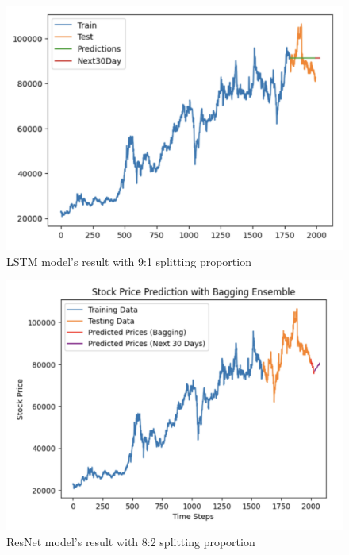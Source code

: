 \documentclass{ieeeojies}
\begin{document}
\begin{figure}[H]
  \centering
  \begin{minipage}{0.8\linewidth}
    \centering
    \includegraphics[width=\linewidth]{bibliography/ETS_VCB91.png}
    \caption{LSTM model's result with 9:1 splitting proportion}
    \label{fig14}
  \end{minipage}
\end{figure}
\begin{figure}[H]
  \centering
  \begin{minipage}{0.8\linewidth}
    \centering
    \includegraphics[width=\linewidth]{bibliography/baggingGRU_vcb.png}
    \caption{ResNet model's result with 8:2 splitting proportion}
    \label{bagginggru}
  \end{minipage}
\end{figure}
\end{document}
